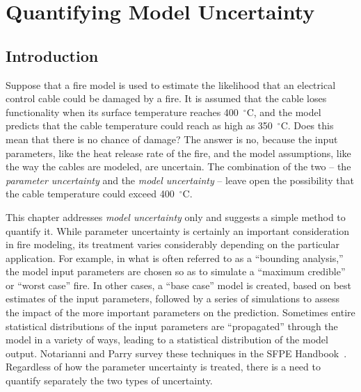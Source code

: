 
\newcommand{\paper}{chapter }

\chapter{Quantifying Model Uncertainty}

\section{Introduction}

Suppose that a fire model is used to estimate the likelihood that an electrical control cable could be damaged by
a fire. It is assumed that the cable loses functionality when its surface temperature reaches 400~$^\circ$C,
and the model predicts that the cable temperature could reach as high as 350~$^\circ$C.
Does this mean that there is no chance of damage? The answer is no, because the input parameters, like the heat release rate of
the fire, and the model assumptions, like the way the cables are modeled, are uncertain. The combination of the
two -- the {\em parameter uncertainty} and the {\em model uncertainty} -- leave open the possibility that the cable temperature could exceed
400~$^\circ$C.

This \paper addresses {\em model uncertainty} only and suggests a simple method to quantify it. While parameter uncertainty is certainly an
important consideration in fire modeling, its treatment varies considerably depending on the particular application. For example, in what is often
referred to as a ``bounding analysis,'' the model input parameters are chosen so as to simulate a ``maximum credible'' or ``worst case'' fire. In other cases,
a ``base case'' model is created, based on best estimates of the input parameters, followed by a series of simulations to assess the impact of the more
important parameters on the prediction.
Sometimes entire statistical distributions of the input parameters are ``propagated'' through the model in a variety of ways, leading to
a statistical distribution of the model output. Notarianni and Parry survey these techniques in the SFPE Handbook~\cite{Notarianni:SFPE}.
Regardless of how the parameter uncertainty is treated, there is a need to quantify separately the two types of uncertainty.

